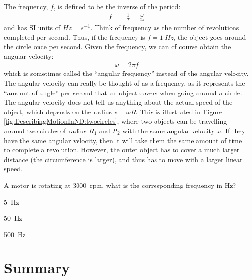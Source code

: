 The frequency, $f$, is defined to be the inverse of the period:
\begin{align*}
f&=\frac{1}{T}=\frac{\omega}{2\pi}
\end{align*}
and has SI units of $\si{Hz}=\si{s^{-1}}$. Think of frequency as the number of revolutions completed per second. Thus, if the frequency is $f=\SI{1}{Hz}$, the object goes around the circle once per second. 
 Given the frequency, we can of course obtain the angular velocity:
\begin{align*}
\omega = 2\pi f
\end{align*}
which is sometimes called the ``angular frequency'' instead of the angular velocity. The angular velocity can really be thought of as a frequency, as it represents the ``amount of angle'' per second that an object covers when going around a circle. The angular velocity does not tell us anything about the actual speed of the object, which depends on the radius $v=\omega R$. This is illustrated in Figure \ref{fig:DescribingMotionInND:twocircles}, where two objects can be travelling around two circles of radius $R_1$ and $R_2$ with the same angular velocity $\omega$. If they have the same angular velocity, then it will take them the same amount of time to complete a revolution. However, the outer object has to cover a much larger distance (the circumference is larger), and thus has to move with a larger linear speed.

\begin{checkpoint}{\begin{MCquestion}{A motor is rotating at \SI{3000}{rpm}, what is the corresponding frequency in \si{Hz}?}
\item \SI{5}{Hz}
\item \SI{50}{Hz}%
\item \SI{500}{Hz}
\end{MCquestion}}
\end{checkpoint}


\newpage
\section{Summary}

